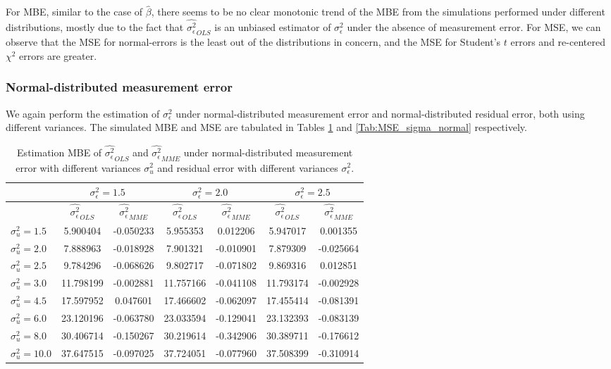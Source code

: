 \documentclass{article}
\begin{document}
For MBE, similar to the case of $\hat{\beta}$, there seems to be no clear monotonic trend of the MBE from the simulations performed under different distributions,
mostly due to the fact that $\hat{\sigma^2_\epsilon}_{OLS}$ is an unbiased estimator of $\sigma^2_\epsilon$ under the absence of measurement error.
For MSE, we can observe that the MSE for normal-errors is the least out of the distributions in concern, and the MSE for Student's $t$ errors and re-centered $\chi^2$ errors are greater.

\subsubsection{Normal-distributed measurement error}

We again perform the estimation of $\sigma^2_\epsilon$ under normal-distributed measurement error and normal-distributed residual error, both using different variances.
The simulated MBE and MSE are tabulated in Tables \ref{Tab:MBE_sigma_normal} and \ref{Tab:MSE_sigma_normal} respectively.

\begin{table}[ht]
    \centering
    \caption{Estimation MBE of $\hat{\sigma^2_\epsilon}_{OLS}$ and $\hat{\sigma^2_\epsilon}_{MME}$ under normal-distributed measurement error with different variances $\sigma^2_u$ and residual error with different variances $\sigma^2_\epsilon$.}
    \label{Tab:MBE_sigma_normal}
    \begin{tabular}[t]{lcccccc}
        \hline
        &\multicolumn{2}{c}{$\sigma^2_\epsilon=1.5$}&\multicolumn{2}{c}{$\sigma^2_\epsilon=2.0$}&\multicolumn{2}{c}{$\sigma^2_\epsilon=2.5$}\\
        \hline
        &$\hat{\sigma^2_\epsilon}_{OLS}$&$\hat{\sigma^2_\epsilon}_{MME}$&$\hat{\sigma^2_\epsilon}_{OLS}$&
        $\hat{\sigma^2_\epsilon}_{MME}$&$\hat{\sigma^2_\epsilon}_{OLS}$&$\hat{\sigma^2_\epsilon}_{MME}$\\
        \hline
        $\sigma^2_u = 1.5$&5.900404&-0.050233&5.955353&0.012206&5.947017&0.001355\\
        $\sigma^2_u = 2.0$&7.888963&-0.018928&7.901321&-0.010901&7.879309&-0.025664\\
        $\sigma^2_u = 2.5$&9.784296&-0.068626&9.802717&-0.071802&9.869316&0.012851\\
        $\sigma^2_u = 3.0$&11.798199&-0.002881&11.757166&-0.041108&11.793174&-0.002928\\
        $\sigma^2_u = 4.5$&17.597952&0.047601&17.466602&-0.062097&17.455414&-0.081391\\
        $\sigma^2_u = 6.0$&23.120196&-0.063780&23.033594&-0.129041&23.132393&-0.083139\\
        $\sigma^2_u = 8.0$&30.406714&-0.150267&30.219614&-0.342906&30.389711&-0.176612\\
        $\sigma^2_u = 10.0$&37.647515&-0.097025&37.724051&-0.077960&37.508399&-0.310914\\
        \hline
    \end{tabular}
\end{table}
\end{document}
